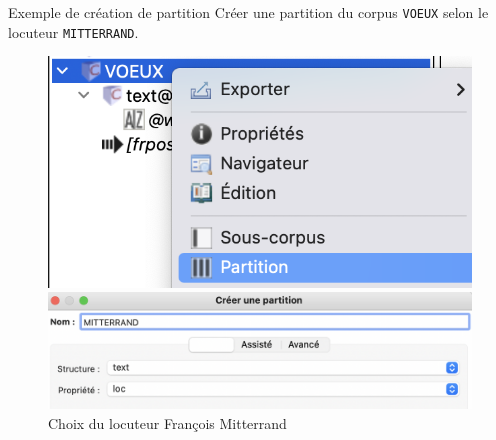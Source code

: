 \documentclass[xetex,xcolor={table,usenames,dvipsnames}]{beamer}
\begin{document}
\begin{frame}{Exemple de création de partition}
Créer une partition du corpus \texttt{VOEUX} selon le locuteur \texttt{MITTERRAND}.

   \begin{figure}[ht]
	\begin{minipage}[b]{0.45\linewidth}
		\centering
		\includegraphics[width=\textwidth]{img/partition.png}
		\caption{Création de la partition.}
		\label{fig:a}
	\end{minipage}
	\hspace{0.5cm}
	\begin{minipage}[b]{0.45\linewidth}
		\centering
		\includegraphics[width=\textwidth]{img/partition_mitterrand.png}
		\caption{Choix du locuteur François Mitterrand}
		\label{fig:b}
	\end{minipage}
\end{figure}

\end{frame}
\end{document}
